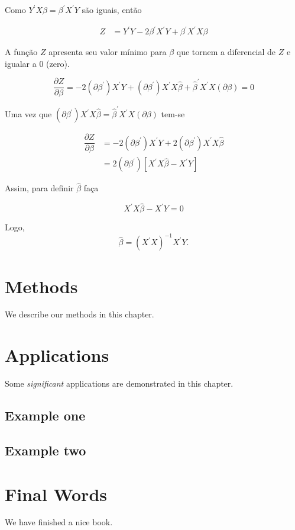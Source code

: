 \documentclass[
]{book}
\begin{document}
Como \(Y^\prime X\beta = \beta^\prime X^\prime Y\) são iguais, então

\begin{align}
Z &= Y^\prime Y -2 \beta^\prime X^\prime Y + \beta^\prime X^\prime X \beta
\end{align}

A função \(Z\) apresenta seu valor mínimo para \(\beta\) que tornem a diferencial de \(Z\) e igualar a 0 (zero).

\begin{equation*}
\dfrac{\partial Z}{\partial \beta}= -2\left(\partial\beta^\prime\right) X^\prime Y + \left(\partial\beta^\prime\right) X^\prime X\hat{\beta} + \hat{\beta}^\prime X^\prime X\left(\partial \beta\right) = 0
\end{equation*}

Uma vez que \(\left(\partial\beta^\prime\right)X^\prime X\hat{\beta} =\hat{\beta}^\prime X^\prime X\left(\partial \beta\right)\) tem-se

\begin{align}
\dfrac{\partial Z}{\partial \beta}&= -2\left(\partial\beta^\prime\right) X^\prime Y + 2\left(\partial\beta^\prime\right) X^\prime X\hat{\beta} \\
  &=2\left(\partial\beta^\prime\right)\left[X^\prime X\hat{\beta}  -X^\prime Y\right]
\end{align}

Assim, para definir \(\hat{\beta}\) faça

\begin{equation*}
X^\prime X\hat{\beta}-X^\prime Y = 0
\end{equation*}

Logo,
\begin{equation*}
\hat{\beta} = \left(X^\prime X\right)^{-1}X^\prime Y.
\end{equation*}

\hypertarget{methods}{%
\chapter{Methods}\label{methods}}

We describe our methods in this chapter.

\hypertarget{applications}{%
\chapter{Applications}\label{applications}}

Some \emph{significant} applications are demonstrated in this chapter.

\hypertarget{example-one}{%
\section{Example one}\label{example-one}}

\hypertarget{example-two}{%
\section{Example two}\label{example-two}}

\hypertarget{final-words}{%
\chapter{Final Words}\label{final-words}}

We have finished a nice book.

  
\end{document}
